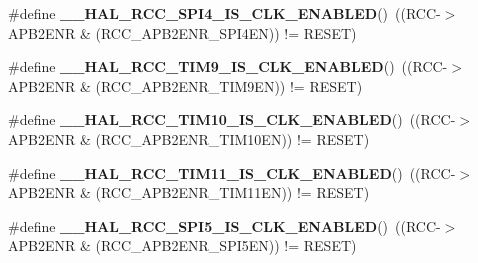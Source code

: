 \begin{DoxyCompactItemize}
\item 
\mbox{\label{group___r_c_c_ex___peripheral___clock___enable___disable___status_ga875c081e76f456494d5e06dae3581281}} 
\#define {\bfseries \+\_\+\+\_\+\+H\+A\+L\+\_\+\+R\+C\+C\+\_\+\+S\+P\+I4\+\_\+\+I\+S\+\_\+\+C\+L\+K\+\_\+\+E\+N\+A\+B\+L\+ED}()~((R\+CC-\/$>$A\+P\+B2\+E\+NR \& (R\+C\+C\+\_\+\+A\+P\+B2\+E\+N\+R\+\_\+\+S\+P\+I4\+EN)) != R\+E\+S\+ET)
\item 
\mbox{\label{group___r_c_c_ex___peripheral___clock___enable___disable___status_gafab635405d33757b42a3df0d89416e8a}} 
\#define {\bfseries \+\_\+\+\_\+\+H\+A\+L\+\_\+\+R\+C\+C\+\_\+\+T\+I\+M9\+\_\+\+I\+S\+\_\+\+C\+L\+K\+\_\+\+E\+N\+A\+B\+L\+ED}()~((R\+CC-\/$>$A\+P\+B2\+E\+NR \& (R\+C\+C\+\_\+\+A\+P\+B2\+E\+N\+R\+\_\+\+T\+I\+M9\+EN)) != R\+E\+S\+ET)
\item 
\mbox{\label{group___r_c_c_ex___peripheral___clock___enable___disable___status_ga7a4890d9368f8ea8c87c64d48f09686d}} 
\#define {\bfseries \+\_\+\+\_\+\+H\+A\+L\+\_\+\+R\+C\+C\+\_\+\+T\+I\+M10\+\_\+\+I\+S\+\_\+\+C\+L\+K\+\_\+\+E\+N\+A\+B\+L\+ED}()~((R\+CC-\/$>$A\+P\+B2\+E\+NR \& (R\+C\+C\+\_\+\+A\+P\+B2\+E\+N\+R\+\_\+\+T\+I\+M10\+EN)) != R\+E\+S\+ET)
\item 
\mbox{\label{group___r_c_c_ex___peripheral___clock___enable___disable___status_ga7db5f2ab1e44c7ebd59a56d3bdd2a517}} 
\#define {\bfseries \+\_\+\+\_\+\+H\+A\+L\+\_\+\+R\+C\+C\+\_\+\+T\+I\+M11\+\_\+\+I\+S\+\_\+\+C\+L\+K\+\_\+\+E\+N\+A\+B\+L\+ED}()~((R\+CC-\/$>$A\+P\+B2\+E\+NR \& (R\+C\+C\+\_\+\+A\+P\+B2\+E\+N\+R\+\_\+\+T\+I\+M11\+EN)) != R\+E\+S\+ET)
\item 
\mbox{\label{group___r_c_c_ex___peripheral___clock___enable___disable___status_ga8a762d7f473a98f820faa57284626b28}} 
\#define {\bfseries \+\_\+\+\_\+\+H\+A\+L\+\_\+\+R\+C\+C\+\_\+\+S\+P\+I5\+\_\+\+I\+S\+\_\+\+C\+L\+K\+\_\+\+E\+N\+A\+B\+L\+ED}()~((R\+CC-\/$>$A\+P\+B2\+E\+NR \& (R\+C\+C\+\_\+\+A\+P\+B2\+E\+N\+R\+\_\+\+S\+P\+I5\+EN)) != R\+E\+S\+ET)
\item 

\end{DoxyCompactItemize}
